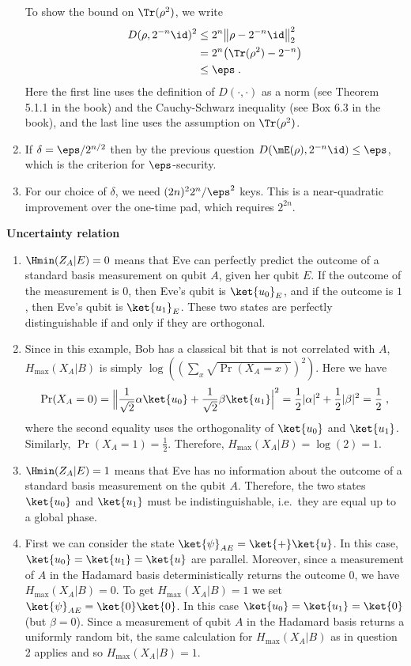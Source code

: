 \begin{exercises}
\begin{enumerate}
To show the bound on $\Tr(\rho^2)$, we write
\begin{align*}
D(\rho,2^{-n}\id)^2 &\leq 2^{n} \big\|\rho-2^{-n}\id\big\|_2^2\\
&= 2^{n}\big(\Tr(\rho^2)- 2^{-n}\big)\\
&\leq \eps\;.
\end{align*}
Here the first line uses the definition of $D(\cdot,\cdot)$ as a norm (see Theorem 5.1.1 in the book) and the Cauchy-Schwarz inequality (see Box 6.3 in the book), and the last line uses the assumption on $\Tr(\rho^2)$. 
\item If $\delta = \eps/2^{n/2}$ then by the previous question $D(\mE(\rho),2^{-n}\id)\leq \eps$, which is the criterion for $\eps$-security. 
\item For our choice of $\delta$, we need $(2n)^2 2^n/\eps^2$ keys. This is a near-quadratic improvement over the one-time pad, which requires $2^{2n}$. 
\end{enumerate}


\item {\bf Uncertainty relation}
\begin{enumerate}
\item $\Hmin(Z_A|E)=0$ means that Eve can perfectly predict the outcome of a standard basis measurement on qubit $A$, given her qubit $E$. If the outcome of the measurement is $0$, then Eve's qubit is $\ket{u_0}_E$, and if the outcome is $1$, then Eve's qubit is $\ket{u_1}_E$. These two states are perfectly distinguishable if and only if they are orthogonal. 
\item Since in this example, Bob has a classical bit that is not correlated with $A$, $H_{\textrm{max}}(X_A|B)$ is simply $\log((\sum_x \sqrt{\Pr(X_A=x)})^2)$. Here we have 
\[ \Pr(X_A=0) = \Big\|\frac{1}{\sqrt{2}}\alpha \ket{u_0}+\frac{1}{\sqrt{2}}\beta\ket{u_1}\Big|^2 = \frac{1}{2}|\alpha|^2 + \frac{1}{2}|\beta|^2 =\frac{1}{2}\;,\]
where the second equality uses the orthogonality of $\ket{u_0}$ and $\ket{u_1}$. Similarly, $\Pr(X_A=1)=\frac{1}{2}$. Therefore, $H_{\textrm{max}}(X_A|B)=\log(2)=1$. 
\item $\Hmin(Z_A|E)=1$ means that Eve has no information about the outcome of a standard basis measurement on the qubit $A$. Therefore, the two states $\ket{u_0}$ and $\ket{u_1}$ must be indistinguishable, i.e.\ they are equal up to a global phase. 
\item First we can consider the state $\ket{\psi}_{AE} = \ket{+}\ket{u}$. In this case, $\ket{u_0}=\ket{u_1}=\ket{u}$ are parallel. Moreover, since a measurement of $A$ in the Hadamard basis deterministically returns the outcome $0$, we have $H_{\textrm{max}}(X_A|B)=0$. To get $H_{\textrm{max}}(X_A|B)=1$ we set $\ket{\psi}_{AE}=\ket{0}\ket{0}$. In this case $\ket{u_0}=\ket{u_1}=\ket{0}$ (but $\beta=0$). Since a measurement of qubit $A$ in the Hadamard basis returns a uniformly random bit, 
the same calculation for $H_{\textrm{max}}(X_A|B)$ as in question 2 applies and so $H_{\textrm{max}}(X_A|B)=1$. 
\end{enumerate}
\end{exercises}